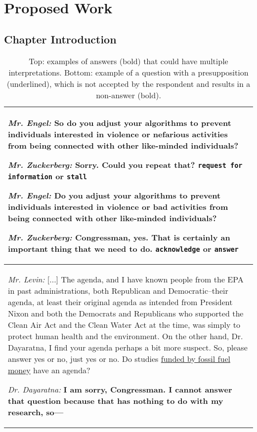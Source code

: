 \chapter{Proposed Work}
\label{ch:proposed}


\section{Chapter Introduction}

\begin{table}[t]
    \centering
    \begin{tabular}{p{11cm}}
    \toprule
    \textit{Mr. Engel:} So do you adjust your algorithms to prevent individuals interested in violence or nefarious activities from being connected with other like-minded individuals?

\textit{Mr. Zuckerberg:} \textbf{Sorry. Could you repeat that?} \texttt{request for information} or \texttt{stall}

\textit{Mr. Engel:} Do you adjust your algorithms to prevent individuals interested in violence or bad activities from being connected with other like-minded individuals?

\textit{Mr. Zuckerberg:} \textbf{Congressman, yes. That is certainly an important thing that we need to do.} \texttt{acknowledge} or \texttt{answer}\\
\midrule
\textit{Mr. Levin:} [...] The agenda, and I have known people from the EPA in past administrations, both Republican and Democratic--their agenda, at least their original agenda as intended from President Nixon and both the Democrats and Republicans who supported the Clean Air Act and the Clean Water Act at the time, was simply to protect human health and the environment.    On the other hand, Dr. Dayaratna, I find your agenda perhaps a bit more suspect. So, please answer yes or no, just yes or no. Do studies \underline{funded by fossil fuel money} have an agenda?

\textit{Dr. Dayaratna:} \textbf{I am sorry, Congressman. I cannot answer that question because that has nothing to do with my research, so---}\\
    \bottomrule
    \end{tabular}
    \caption{Top: examples of answers (bold) that could have multiple interpretations. Bottom: example of a question with a presupposition (underlined), which is not accepted by the respondent and results in a non-answer (bold).}
    \label{tab:example}
\end{table}

